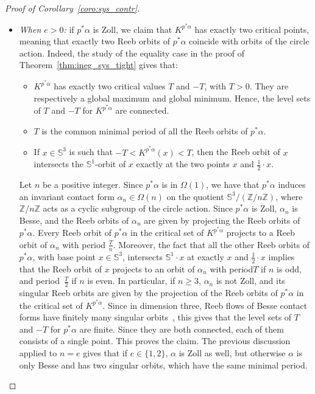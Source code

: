 \documentclass[AHL,Unicode,longabstracts]{cedram}
\newcommand{\bbS}{\mathbb{S}}
\newcommand{\bbZ}{\mathbb{Z}}
\newcommand{\bbS}{\mathbb{S}}
\begin{document}
\begin{proof}[{Proof of Corollary~\ref{coro:sys_contr}}]
\begin{itemize}
\item \emph{When $e > 0$:} if $p^* \alpha$ is Zoll, we claim that $K^{p^* \alpha}$ has exactly two critical points, meaning that exactly two Reeb orbits of $p^* \alpha$ coincide with orbits of the circle action. Indeed, the study of the equality case in the proof of Theorem~\ref{thm:ineg_sys_tight} gives that:
\begin{itemize}
\item $K^{p^* \alpha}$ has exactly two critical values $T$ and $-T$, with $T > 0$. They are respectively a global maximum and global minimum. Hence, the level sets of $T$ and $-T$ for $K^{p^* \alpha}$ are connected.
\item $T$ is the common minimal period of all the Reeb orbits of $p^* \alpha$.
\item If $x \in \bbS^3$ is such that $-T < K^{p^* \alpha}(x) < T$, then the Reeb orbit of $x$ intersects the $\bbS^1$-orbit of $x$ exactly at the two points $x$ and $\frac{1}{2} \cdot x$.
\end{itemize}
Let $n$ be a positive integer. Since $p^* \alpha$ is in $\Omega(1)$, we have that $p^* \alpha$ induces an invariant contact form $\alpha_n \in \Omega(n)$ on the quotient $\bbS^3 / (\bbZ/n \bbZ)$, where $\bbZ/n \bbZ$ acts as a cyclic subgroup of the circle action. Since $p^* \alpha$ is Zoll, $\alpha_n$ is Besse, and the Reeb orbits of $\alpha_n$ are given by projecting the Reeb orbits of $p^* \alpha$. Every Reeb orbit of $p^* \alpha$ in the critical set of $K^{p^* \alpha}$ projects to a Reeb orbit of $\alpha_n$ with period $\frac{T}{n}$. Moreover, the fact that all the other Reeb orbits of $p^* \alpha$, with base point $x \in \bbS^3$, intersects $\bbS^1 \cdot x$ at exactly $x$ and $\frac{1}{2} \cdot x$ implies that the Reeb orbit of $x$ projects to an orbit of $\alpha_n$ with period$T$ if $n$ is odd, and period~$\frac{T}{2}$ if $n$ is even. In particular, if $n \geq 3$, $\alpha_n$ is not Zoll, and its singular Reeb orbits are given by the projection of the Reeb orbits of $p^* \alpha$ in the critical set of $K^{p^* \alpha}$. Since in dimension three, Reeb flows of Besse contact forms have finitely many singular orbits~\cite{Epstein}, this gives that the level sets of $T$ and $-T$ for $p^* \alpha$ are finite. Since they are both connected, each of them consists of a single point. This proves the claim. The previous discussion applied to $n = e$ gives that if $e \in \{1,2\}$, $\alpha$ is Zoll as well, but otherwise $\alpha$ is only Besse and has two singular orbits, which have the same minimal period.


\end{itemize}
\end{proof}
\end{document}
